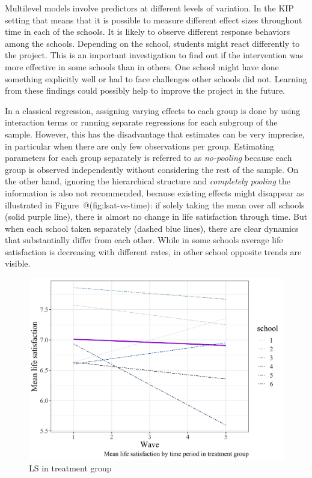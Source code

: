 \documentclass[a4, 12pt]{article}
\begin{document}
Multilevel models involve predictors at different levels of variation. In the KIP setting that means that it is possible to measure different effect sizes throughout time in each of the schools. It is likely to observe different response behaviors among the schools. Depending on the school, students might react differently to the project. This is an important investigation to find out if the intervention was more effective in some schools than in others. One school might have done something explicitly well or had to face challenges other schools did not. Learning from these findings could possibly help to improve the project in the future.

In a classical regression, assigning varying effects to each group is done by using interaction terms or running separate regressions for each subgroup of the sample. However, this has the disadvantage that estimates can be very imprecise, in particular when there are only few observations per group. Estimating parameters for each group separately is referred to as \emph{no-pooling} because each group is observed independently without considering the rest of the sample. On the other hand, ignoring the hierarchical structure and \emph{completely pooling} the information is also not recommended, because existing effects might disappear as illustrated in Figure~@(fig:lsat-vs-time): if solely taking the mean over all schools (solid purple line), there is almost no change in life satisfaction through time. But when each school taken separately (dashed blue lines), there are clear dynamics that substantially differ from each other. While in some schools average life satisfaction is decreasing with different rates, in other school opposite trends are visible.

\begin{figure}[H]

{\centering \includegraphics[width=0.8\linewidth,]{../figures/lsat_vs_time_by_school_treated} 

}

\caption{LS in treatment group}\label{fig:lsat-vs-time}
\end{figure}
\end{document}

